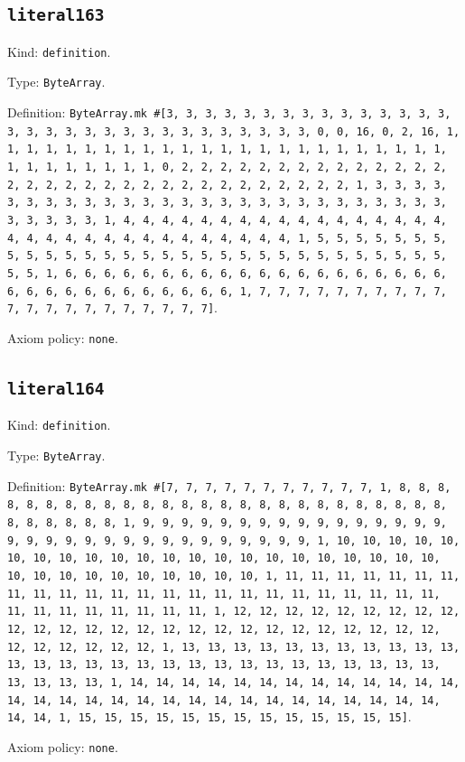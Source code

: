 \documentclass[11pt]{article}
\begin{document}
\subsection*{\texttt{literal163}}
\noindent Kind: \texttt{definition}.\par
\noindent Type: \texttt{ByteArray}.\par
\noindent Definition: \texttt{ByteArray.mk \#[3, 3, 3, 3, 3, 3, 3, 3, 3, 3, 3, 3, 3, 3, 3, 3, 3, 3, 3, 3, 3, 3, 3, 3, 3, 3, 3, 3, 3, 3, 3, 0, 0, 16, 0, 2, 16, 1, 1, 1, 1, 1, 1, 1, 1, 1, 1, 1, 1, 1, 1, 1, 1, 1, 1, 1, 1, 1, 1, 1, 1, 1, 1, 1, 1, 1, 1, 1, 1, 0, 2, 2, 2, 2, 2, 2, 2, 2, 2, 2, 2, 2, 2, 2, 2, 2, 2, 2, 2, 2, 2, 2, 2, 2, 2, 2, 2, 2, 2, 2, 2, 2, 1, 3, 3, 3, 3, 3, 3, 3, 3, 3, 3, 3, 3, 3, 3, 3, 3, 3, 3, 3, 3, 3, 3, 3, 3, 3, 3, 3, 3, 3, 3, 3, 3, 1, 4, 4, 4, 4, 4, 4, 4, 4, 4, 4, 4, 4, 4, 4, 4, 4, 4, 4, 4, 4, 4, 4, 4, 4, 4, 4, 4, 4, 4, 4, 4, 4, 1, 5, 5, 5, 5, 5, 5, 5, 5, 5, 5, 5, 5, 5, 5, 5, 5, 5, 5, 5, 5, 5, 5, 5, 5, 5, 5, 5, 5, 5, 5, 5, 5, 1, 6, 6, 6, 6, 6, 6, 6, 6, 6, 6, 6, 6, 6, 6, 6, 6, 6, 6, 6, 6, 6, 6, 6, 6, 6, 6, 6, 6, 6, 6, 6, 6, 1, 7, 7, 7, 7, 7, 7, 7, 7, 7, 7, 7, 7, 7, 7, 7, 7, 7, 7, 7, 7, 7]}.\par
\noindent Axiom policy: \texttt{none}.\par
\subsection*{\texttt{literal164}}
\noindent Kind: \texttt{definition}.\par
\noindent Type: \texttt{ByteArray}.\par
\noindent Definition: \texttt{ByteArray.mk \#[7, 7, 7, 7, 7, 7, 7, 7, 7, 7, 7, 1, 8, 8, 8, 8, 8, 8, 8, 8, 8, 8, 8, 8, 8, 8, 8, 8, 8, 8, 8, 8, 8, 8, 8, 8, 8, 8, 8, 8, 8, 8, 8, 8, 1, 9, 9, 9, 9, 9, 9, 9, 9, 9, 9, 9, 9, 9, 9, 9, 9, 9, 9, 9, 9, 9, 9, 9, 9, 9, 9, 9, 9, 9, 9, 9, 9, 1, 10, 10, 10, 10, 10, 10, 10, 10, 10, 10, 10, 10, 10, 10, 10, 10, 10, 10, 10, 10, 10, 10, 10, 10, 10, 10, 10, 10, 10, 10, 10, 10, 1, 11, 11, 11, 11, 11, 11, 11, 11, 11, 11, 11, 11, 11, 11, 11, 11, 11, 11, 11, 11, 11, 11, 11, 11, 11, 11, 11, 11, 11, 11, 11, 11, 1, 12, 12, 12, 12, 12, 12, 12, 12, 12, 12, 12, 12, 12, 12, 12, 12, 12, 12, 12, 12, 12, 12, 12, 12, 12, 12, 12, 12, 12, 12, 12, 12, 1, 13, 13, 13, 13, 13, 13, 13, 13, 13, 13, 13, 13, 13, 13, 13, 13, 13, 13, 13, 13, 13, 13, 13, 13, 13, 13, 13, 13, 13, 13, 13, 13, 1, 14, 14, 14, 14, 14, 14, 14, 14, 14, 14, 14, 14, 14, 14, 14, 14, 14, 14, 14, 14, 14, 14, 14, 14, 14, 14, 14, 14, 14, 14, 14, 14, 1, 15, 15, 15, 15, 15, 15, 15, 15, 15, 15, 15, 15, 15]}.\par
\noindent Axiom policy: \texttt{none}.\par
\end{document}
